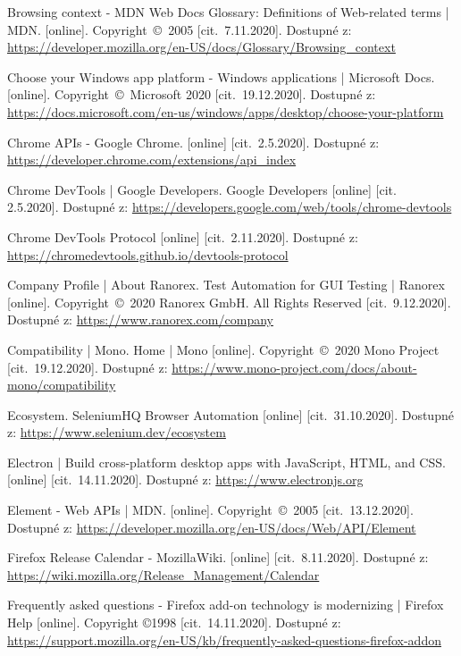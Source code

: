 \begin{thebibliography}{99}
 Browsing context - MDN Web Docs Glossary: Definitions of Web-related terms | MDN. [online]. Copyright~©~2005 [cit.~7.11.2020]. Dostupné z: \url{https://developer.mozilla.org/en-US/docs/Glossary/Browsing_context}

 Choose your Windows app platform - Windows applications | Microsoft Docs. [online]. Copyright~©~Microsoft 2020 [cit.~19.12.2020]. Dostupné z: \url{https://docs.microsoft.com/en-us/windows/apps/desktop/choose-your-platform}

 Chrome APIs - Google Chrome. [online] [cit.~2.5.2020]. Dostupné z: \url{https://developer.chrome.com/extensions/api_index}

 Chrome DevTools  |  Google Developers. Google Developers [online] [cit.~	2.5.2020]. Dostupné z: 	\url{https://developers.google.com/web/tools/chrome-devtools}

 Chrome DevTools Protocol [online] [cit.~2.11.2020]. Dostupné z: \url{https://chromedevtools.github.io/devtools-protocol}

 Company Profile | About Ranorex. Test Automation for GUI Testing | Ranorex [online]. Copyright~©~2020 Ranorex GmbH. All Rights Reserved [cit.~9.12.2020]. Dostupné z: \url{https://www.ranorex.com/company}

 Compatibility | Mono. Home | Mono [online]. Copyright~©~2020 Mono Project [cit.~19.12.2020]. Dostupné z: \url{https://www.mono-project.com/docs/about-mono/compatibility}

 Ecosystem. SeleniumHQ Browser Automation [online] [cit.~31.10.2020]. Dostupné z: \url{https://www.selenium.dev/ecosystem}

 Electron | Build cross-platform desktop apps with JavaScript, HTML, and CSS. [online] [cit.~14.11.2020]. Dostupné z: \url{https://www.electronjs.org}

 Element - Web APIs | MDN. [online]. Copyright~©~2005 [cit.~13.12.2020]. Dostupné z: \url{https://developer.mozilla.org/en-US/docs/Web/API/Element}

 Firefox Release Calendar - MozillaWiki. [online] [cit.~8.11.2020]. Dostupné z: \url{https://wiki.mozilla.org/Release_Management/Calendar}

 Frequently asked questions - Firefox add-on technology is modernizing | Firefox Help [online]. Copyright ©1998 [cit.~14.11.2020]. Dostupné z: \url{https://support.mozilla.org/en-US/kb/frequently-asked-questions-firefox-addon}


\end{thebibliography}
